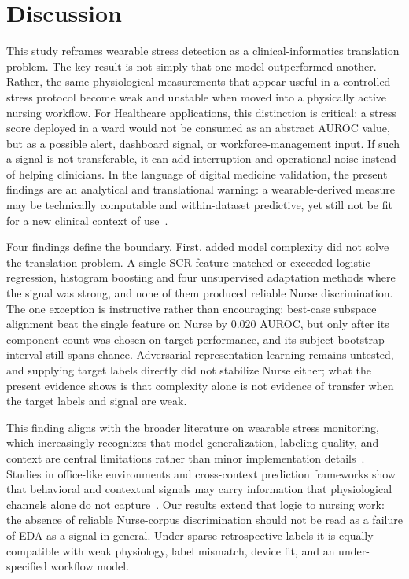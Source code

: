 \documentclass[healthcare,article,submit,moreauthors,pdftex]{Definitions/mdpi}
\begin{document}
\section{Discussion}

This study reframes wearable stress detection as a clinical-informatics
translation problem. The key result is not simply that one model outperformed
another. Rather, the same physiological measurements that appear useful in a
controlled stress protocol become weak and unstable when moved into a physically
active nursing workflow. For Healthcare applications, this distinction is
critical: a stress score deployed in a ward would not be consumed as an abstract
AUROC value, but as a possible alert, dashboard signal, or workforce-management
input. If such a signal is not transferable, it can add interruption and
operational noise instead of helping clinicians. In the language of digital
medicine validation, the present findings are an analytical and translational
warning: a wearable-derived measure may be technically computable and
within-dataset predictive, yet still not be fit for a new clinical context of
use~\cite{goldsack2020v3,manta2020digitalmeasures}.

Four findings define the boundary. First, added model complexity did not solve
the translation problem. A single SCR feature matched or exceeded logistic
regression, histogram boosting and four unsupervised adaptation methods where the
signal was strong, and none of them produced reliable Nurse discrimination. The
one exception is instructive rather than encouraging: best-case subspace
alignment beat the single feature on Nurse by $0.020$ AUROC, but only after its
component count was chosen on target performance, and its subject-bootstrap
interval still spans chance. Adversarial representation learning remains untested,
and supplying target labels directly did not stabilize Nurse either; what the
present evidence shows is that complexity alone is not evidence of transfer when
the target labels and signal are weak.

This finding aligns with the broader literature on wearable stress monitoring,
which increasingly recognizes that model generalization, labeling quality, and
context are central limitations rather than minor implementation
details~\cite{vos2023generalizable,tutunji2023prolonged}. Studies in office-like
environments and cross-context prediction frameworks show that behavioral and
contextual signals may carry information that physiological channels alone do not
capture~\cite{naegelin2023interpretable,mihirette2025crosscontextual}. Our
results extend that logic to nursing work: the absence of reliable Nurse-corpus
discrimination should not be read as a failure of EDA as a signal in general.
Under sparse retrospective labels it is equally compatible with weak physiology,
label mismatch, device fit, and an under-specified workflow model.
\end{document}
